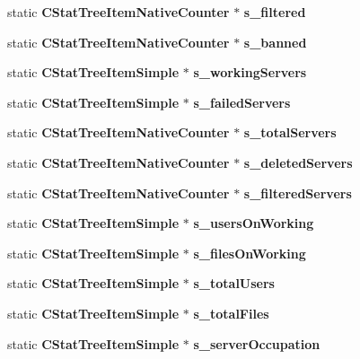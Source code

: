 \begin{DoxyCompactItemize}
\item 
static {\bf CStatTreeItemNativeCounter} $\ast$ {\bfseries s\_\-filtered}\label{classCStatistics_aaa997284e9338481c6cb2c65dbbbda16}

\item 
static {\bf CStatTreeItemNativeCounter} $\ast$ {\bfseries s\_\-banned}\label{classCStatistics_a5ee609ae2ea56dd77bcfbd136493b4e0}

\item 
static {\bf CStatTreeItemSimple} $\ast$ {\bfseries s\_\-workingServers}\label{classCStatistics_a4b8b3a5c581ba9b2b0cedae26ca13ec3}

\item 
static {\bf CStatTreeItemSimple} $\ast$ {\bfseries s\_\-failedServers}\label{classCStatistics_ab506a8fdbccd68e9f80980c9594a8238}

\item 
static {\bf CStatTreeItemNativeCounter} $\ast$ {\bfseries s\_\-totalServers}\label{classCStatistics_ae0a3f49f40bfd35f80b74d323147f114}

\item 
static {\bf CStatTreeItemNativeCounter} $\ast$ {\bfseries s\_\-deletedServers}\label{classCStatistics_a8b93d7fe360ee999797efb889b13a847}

\item 
static {\bf CStatTreeItemNativeCounter} $\ast$ {\bfseries s\_\-filteredServers}\label{classCStatistics_a0ba256d3cacdfe6d23b307874f1ef6e5}

\item 
static {\bf CStatTreeItemSimple} $\ast$ {\bfseries s\_\-usersOnWorking}\label{classCStatistics_a3a541ec50789f88dee4179b439e35e27}

\item 
static {\bf CStatTreeItemSimple} $\ast$ {\bfseries s\_\-filesOnWorking}\label{classCStatistics_a2bb9deaee39649f6b0c7b73ba4dbaad8}

\item 
static {\bf CStatTreeItemSimple} $\ast$ {\bfseries s\_\-totalUsers}\label{classCStatistics_a2548b79239280c05f91f072ca853a5e2}

\item 
static {\bf CStatTreeItemSimple} $\ast$ {\bfseries s\_\-totalFiles}\label{classCStatistics_a98459f50f220cda3bd59c390a7494d55}

\item 
static {\bf CStatTreeItemSimple} $\ast$ {\bfseries s\_\-serverOccupation}\label{classCStatistics_a57b459edf239a7ccedd1f984ddf61e81}


\end{DoxyCompactItemize}
